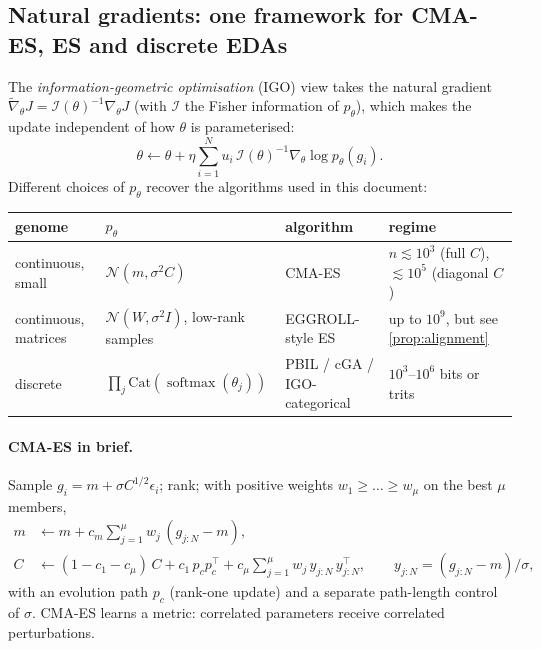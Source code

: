 \documentclass[11pt,a4paper]{article}
\theoremstyle{definition}
\theoremstyle{plain}
\theoremstyle{remark}
\newcommand{\softmax}{\operatorname{softmax}}
\begin{document}
\subsection{Natural gradients: one framework for CMA-ES, ES and discrete EDAs}

The \emph{information-geometric optimisation} (IGO) view takes the natural gradient $\tilde\nabla_\theta J = \mathcal{I}(\theta)^{-1}\nabla_\theta J$ (with $\mathcal{I}$ the Fisher information of $p_\theta$), which makes the update independent of how $\theta$ is parameterised:
\begin{equation}
\label{eq:igo}
\theta \leftarrow \theta + \eta \sum_{i=1}^N u_i\,\mathcal{I}(\theta)^{-1}\nabla_\theta\log p_\theta(g_i).
\end{equation}
Different choices of $p_\theta$ recover the algorithms used in this document:

\begin{center}
\small
\begin{tabularx}{\linewidth}{@{}p{2.6cm}p{3.6cm}p{3.3cm}X@{}}
\toprule
genome & $p_\theta$ & algorithm & regime \\
\midrule
continuous, small & $\mathcal{N}(m,\sigma^2 C)$ & CMA-ES & $n\lesssim 10^3$ (full $C$), $\lesssim 10^5$ (diagonal $C$) \\
continuous, matrices & $\mathcal{N}(W,\sigma^2 I)$, low-rank samples & EGGROLL-style ES & up to $10^9$, but see \cref{prop:alignment} \\
discrete & $\prod_j \mathrm{Cat}(\softmax(\theta_j))$ & PBIL / cGA / IGO-categorical & $10^3$--$10^6$ bits or trits \\
\bottomrule
\end{tabularx}
\end{center}

\paragraph{CMA-ES in brief.} Sample $g_i = m + \sigma C^{1/2}\epsilon_i$; rank; with positive weights $w_1\ge\dots\ge w_\mu$ on the best $\mu$ members,
\begin{align}
m &\leftarrow m + c_m \textstyle\sum_{j=1}^{\mu} w_j\,(g_{j:N} - m),\\
C &\leftarrow (1-c_1-c_\mu)\,C + c_1\, p_c p_c^\top + c_\mu \textstyle\sum_{j=1}^\mu w_j\, y_{j:N}\,y_{j:N}^\top, \qquad y_{j:N} = (g_{j:N}-m)/\sigma,
\end{align}
with an evolution path $p_c$ (rank-one update) and a separate path-length control of $\sigma$. CMA-ES learns a metric: correlated parameters receive correlated perturbations.
\end{document}
